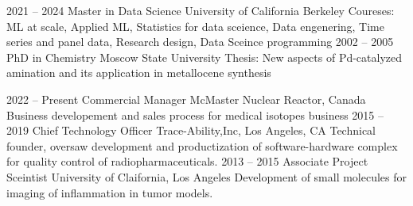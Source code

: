 \documentclass[9pt]{developercv} %
\begin{document}


\begin{entrylist}
	\entry
	{2021 -- 2024}
	{Master in Data Science}
	{University of California Berkeley}
	{Coureses: ML at scale, Applied ML, Statistics for data sceience, Data engenering, Time series and panel data, Research design, Data Sceince programming}
	\entry
	{2002 -- 2005}
	{PhD in Chemistry}
	{Moscow State University}
	{Thesis: New aspects of Pd-catalyzed amination and its application in metallocene synthesis}
\end{entrylist}
\begin{entrylist}
	\entry
		{2022 -- Present}
		{Commercial Manager}
		{McMaster Nuclear Reactor, Canada}
		{Business developement and sales process for medical isotopes business}
	\entry
		{2015 -- 2019}
		{Chief Technology Officer}
		{Trace-Ability,Inc, Los Angeles, CA}
		{Technical founder, oversaw development and productization of software-hardware complex for quality control of radiopharmaceuticals.}
	\entry
		{2013 -- 2015}
		{Associate Project Sceintist}
		{University of Claifornia, Los Angeles}
		{Development of small molecules for imaging of inflammation in tumor models.}
\end{entrylist}


\end{document}

